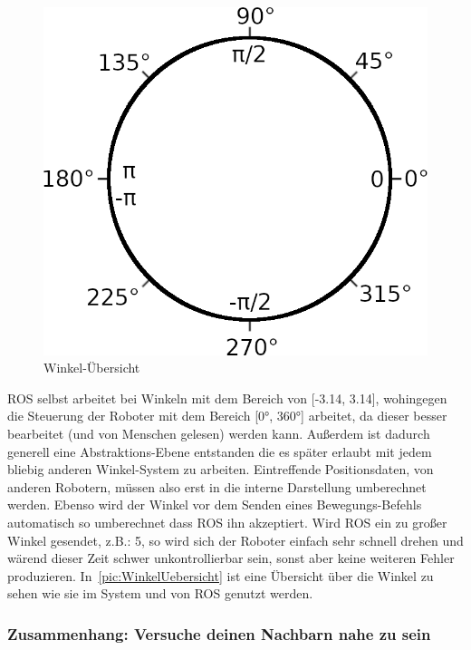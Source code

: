 \begin{figure}
	\includegraphics[width=\pictureWidth,keepaspectratio]{graphics/WinkelTemplate.png}
	\caption{Winkel-Übersicht}
	\label{pic:WinkelUebersicht}
\end{figure}

ROS selbst arbeitet bei Winkeln mit dem Bereich von [-3.14, 3.14], wohingegen die Steuerung der Roboter mit dem Bereich [0°, 360°] arbeitet, da dieser besser bearbeitet (und von Menschen gelesen) werden kann. Außerdem ist dadurch generell eine Abstraktions-Ebene entstanden die es später erlaubt mit jedem bliebig anderen Winkel-System zu arbeiten.
Eintreffende Positionsdaten, von anderen Robotern, müssen also erst in die interne Darstellung umberechnet werden. Ebenso wird der Winkel vor dem Senden eines Bewegungs-Befehls automatisch so umberechnet dass ROS ihn akzeptiert. Wird ROS ein zu großer Winkel gesendet, z.B.: 5, so wird sich der Roboter einfach sehr schnell drehen und wärend dieser Zeit schwer unkontrollierbar sein, sonst aber keine weiteren Fehler produzieren.
In~\autoref{pic:WinkelUebersicht} ist eine Übersicht über die Winkel zu sehen wie sie im System und von ROS genutzt werden.
 
\subsubsection*{Zusammenhang: Versuche deinen Nachbarn nahe zu sein}

